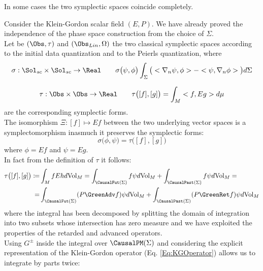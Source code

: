 \documentclass[Main]{subfiles}
\begin{document}
	In some cases the two symplectic spaces coincide completely.
		\begin{example}\label{Ex:SimplettomorphismPhaseSpace}
		Consider the Klein-Gordon scalar field $(E,P)$.
		We have already proved the independence of the phase space construction from the choice of $\Sigma$.\\
		Let be $(\Obs,\tau)$ and $(\Obs_{Lin},\Omega)$ the two classical symplectic spaces according to the initial data quantization and to the Peierls quantization, where
		\begin{displaymath}
			\sigma: \Sol_{sc}\times \Sol_{sc} \rightarrow \Real \qquad
			\sigma\big( \psi, \phi \big) \int_\Sigma \big( <\nabla_n \psi ,\phi>  - <\psi, \nabla_n \phi> \big) d\Sigma
		\end{displaymath}

		\begin{displaymath}
			\tau: \Obs \times \Obs \rightarrow \Real \qquad
			\tau \big( [f] ,[g] \big) = \int_M < f, Eg> d\mu
		\end{displaymath}
		are the corresponding symplectic forms.\\
		The isomorphism $\Xi: [f] \mapsto E f$ between the two underlying vector spaces is a symplectomorphism
		inasmuch it preserves the symplectic forms:
		\begin{displaymath}
			\sigma \big( \phi, \psi \big) =  \tau\big( [f], [g] \big)
		\end{displaymath}
		where $\phi = E f$ and $\psi= E g$.\\
		In fact from the definition of $\tau$ it follows:
		\begin{align}
		\tau\big( [f], [g] \big) \coloneqq  & \int_M f E h d\textrm{Vol}_M =
		\int_{\CausalFut(\Sigma)} f \psi d\textrm{Vol}_M	 + \int_{\CausalPast(\Sigma)} f \psi d\textrm{Vol}_M =	\nonumber \\
		=& \int_{\CausalFut(\Sigma)} (P \GreenAdv f) \psi d\textrm{Vol}_M	 + \int_{\CausalPast(\Sigma)} ( P \GreenRet f ) \psi d\textrm{Vol}_M
		\end{align}
		where the integral has been decomposed by splitting the domain of integration into two subsets whose intersection has zero measure and we have exploited the properties of the retarded and advanced operators.\\
		Using $G^\pm$ inside the integral over $\CausalPM(\Sigma)$ and considering the explicit representation of the Klein-Gordon operator (Eq. \ref{Eq:KGOperator}) allows us to integrate by parts twice:
		\begin{align}

\end{align}
\end{example}
\end{document}

